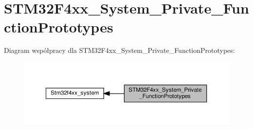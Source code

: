 \hypertarget{group___s_t_m32_f4xx___system___private___function_prototypes}{}\section{S\+T\+M32\+F4xx\+\_\+\+System\+\_\+\+Private\+\_\+\+Function\+Prototypes}
\label{group___s_t_m32_f4xx___system___private___function_prototypes}
Diagram współpracy dla S\+T\+M32\+F4xx\+\_\+\+System\+\_\+\+Private\+\_\+\+Function\+Prototypes\+:\nopagebreak
\begin{figure}[H]
\begin{center}
\leavevmode
\includegraphics[width=350pt]{group___s_t_m32_f4xx___system___private___function_prototypes}
\end{center}
\end{figure}
